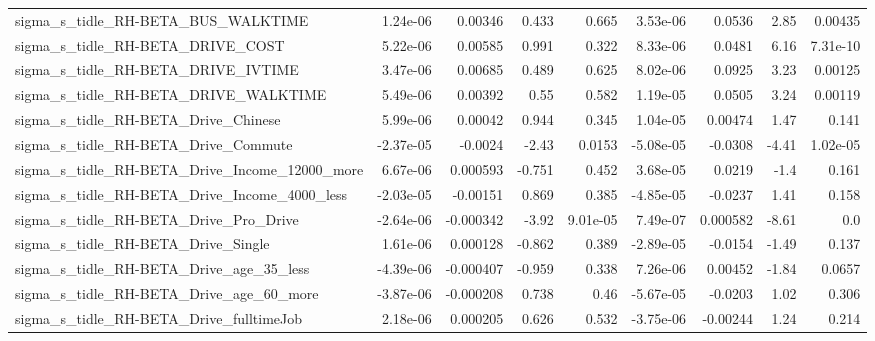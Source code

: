 \begin{tabular}{lrrrrrrrr}
sigma\_s\_tidle\_RH-BETA\_BUS\_WALKTIME                 &    1.24e-06 &      0.00346 &     0.433 &    0.665 &   3.53e-06 &      0.0536 &         2.85 &       0.00435 \\
sigma\_s\_tidle\_RH-BETA\_DRIVE\_COST                   &    5.22e-06 &      0.00585 &     0.991 &    0.322 &   8.33e-06 &      0.0481 &         6.16 &      7.31e-10 \\
sigma\_s\_tidle\_RH-BETA\_DRIVE\_IVTIME                 &    3.47e-06 &      0.00685 &     0.489 &    0.625 &   8.02e-06 &      0.0925 &         3.23 &       0.00125 \\
sigma\_s\_tidle\_RH-BETA\_DRIVE\_WALKTIME               &    5.49e-06 &      0.00392 &      0.55 &    0.582 &   1.19e-05 &      0.0505 &         3.24 &       0.00119 \\
sigma\_s\_tidle\_RH-BETA\_Drive\_Chinese                &    5.99e-06 &      0.00042 &     0.944 &    0.345 &   1.04e-05 &     0.00474 &         1.47 &         0.141 \\
sigma\_s\_tidle\_RH-BETA\_Drive\_Commute                &   -2.37e-05 &      -0.0024 &     -2.43 &   0.0153 &  -5.08e-05 &     -0.0308 &        -4.41 &      1.02e-05 \\
sigma\_s\_tidle\_RH-BETA\_Drive\_Income\_12000\_more      &    6.67e-06 &     0.000593 &    -0.751 &    0.452 &   3.68e-05 &      0.0219 &         -1.4 &         0.161 \\
sigma\_s\_tidle\_RH-BETA\_Drive\_Income\_4000\_less       &   -2.03e-05 &     -0.00151 &     0.869 &    0.385 &  -4.85e-05 &     -0.0237 &         1.41 &         0.158 \\
sigma\_s\_tidle\_RH-BETA\_Drive\_Pro\_Drive              &   -2.64e-06 &    -0.000342 &     -3.92 & 9.01e-05 &   7.49e-07 &    0.000582 &        -8.61 &           0.0 \\
sigma\_s\_tidle\_RH-BETA\_Drive\_Single                 &    1.61e-06 &     0.000128 &    -0.862 &    0.389 &  -2.89e-05 &     -0.0154 &        -1.49 &         0.137 \\
sigma\_s\_tidle\_RH-BETA\_Drive\_age\_35\_less            &   -4.39e-06 &    -0.000407 &    -0.959 &    0.338 &   7.26e-06 &     0.00452 &        -1.84 &        0.0657 \\
sigma\_s\_tidle\_RH-BETA\_Drive\_age\_60\_more            &   -3.87e-06 &    -0.000208 &     0.738 &     0.46 &  -5.67e-05 &     -0.0203 &         1.02 &         0.306 \\
sigma\_s\_tidle\_RH-BETA\_Drive\_fulltimeJob            &    2.18e-06 &     0.000205 &     0.626 &    0.532 &  -3.75e-06 &    -0.00244 &         1.24 &         0.214 \\

\end{tabular}
